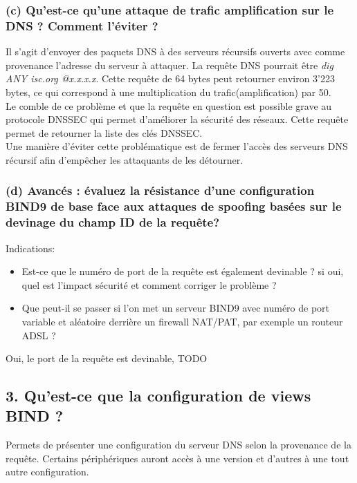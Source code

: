 \documentclass{article}
\begin{document}
\subsubsection*{(c) Qu’est-ce qu’une attaque de trafic amplification sur le DNS ? Comment l’éviter ?}
Il s'agit d'envoyer des paquets DNS à des serveurs récursifs ouverts avec comme provenance l'adresse du serveur à attaquer. La requête DNS pourrait être \textit{dig ANY isc.org @x.x.x.x}. Cette requête de 64 bytes peut retourner environ 3'223 bytes, ce qui correspond à une multiplication du  trafic(amplification) par 50.\cite{DDOS}\cite{amplification}\cite{attaques}\\

Le comble de ce problème et que la requête en question est possible grave au protocole DNSSEC qui permet d'améliorer la sécurité des réseaux. Cette requête permet de retourner la liste des clés DNSSEC.\\

Une manière d'éviter cette problématique est de fermer l'accès des serveurs DNS récursif afin d'empêcher les attaquants de les détourner.\\

\subsubsection*{(d) Avancés : évaluez la résistance d’une configuration BIND9 de base face aux attaques de spoofing basées sur le devinage du champ ID de la requête?}
Indications:
\begin{itemize}
\item Est-ce que le numéro de port de la requête est également devinable ? si oui, quel est l’impact sécurité et comment corriger le problème ?
\item Que peut-il se passer si l’on met un serveur BIND9 avec numéro de port variable et aléatoire derrière un firewall NAT/PAT, par exemple un routeur ADSL ?
\end{itemize}

Oui, le port de la requête est devinable, 
TODO\\

\subsection*{3. Qu’est-ce que la configuration de views BIND ?}
Permets de présenter une configuration du serveur DNS selon la provenance de la requête. Certains périphériques auront accès à une version et d'autres à une tout autre configuration.\cite{views}\\
\end{document}
